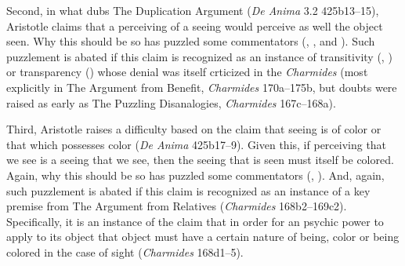 Second, in what \citet{caston02} dubs The Duplication Argument (\emph{De Anima} 3.2 425b13–15), Aristotle claims that a perceiving of a seeing would perceive as well the object seen. Why this should be so has puzzled some commentators (\citealt[435]{Hicks:1907uq}, \citealt[121–2]{Hamlyn:2002ys}, and \citealt[44–5]{Kosman:2014ab}). Such puzzlement is abated if this claim is recognized as an instance of transitivity (\citealt{McCabe:2007ss}, \citealt{McCabe:2007jb}) or transparency (\citealt{Tsouna:2022aa}) whose denial was itself crticized in the \emph{Charmides} (most explicitly in The Argument from Benefit, \emph{Charmides} 170a–175b, but doubts were raised as early as The Puzzling Disanalogies, \emph{Charmides} 167c–168a).

Third, Aristotle raises a difficulty based on the claim that seeing is of color or that which possesses color (\emph{De Anima} 425b17–9). Given this, if perceiving that we see is a seeing that we see, then the seeing that is seen must itself be colored. Again, why this should be so has puzzled some commentators (\citealt[122]{Hamlyn:2002ys}, \citealt[45–6]{Kosman:2014ab}). And, again, such puzzlement is abated if this claim is recognized as an instance of a key premise from The Argument from Relatives (\emph{Charmides} 168b2–169c2). Specifically, it is an instance of the claim that in order for an psychic power to apply to its object that object must have a certain nature of being, color or being colored in the case of sight (\emph{Charmides} 168d1–5).

%
%
%

